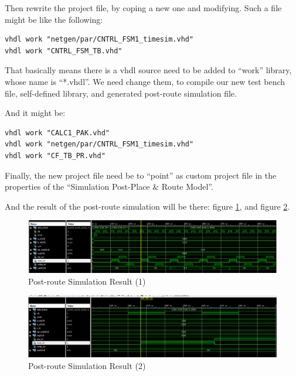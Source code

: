 \documentclass{article}
\begin{document}
    Then rewrite the project file, by coping a new one and modifying. Such a file might be like the following:
    
    \begin{lstlisting}
vhdl work "netgen/par/CNTRL_FSM1_timesim.vhd"
vhdl work "CNTRL_FSM_TB.vhd"
    \end{lstlisting}
    
    That basically means there is a vhdl source need to be added to ``work'' library, whose name is ``*.vhdl''.
    We need change them, to compile our new test bench file, self-defined library, and generated post-route simulation file.
    
    And it might be:
    
\begin{lstlisting}
vhdl work "CALC1_PAK.vhd"
vhdl work "netgen/par/CNTRL_FSM1_timesim.vhd"
vhdl work "CF_TB_PR.vhd"
\end{lstlisting}

    Finally, the new project file need be to ``point'' as custom project file in the properties of the 
    ``Simulation Post-Place \& Route Model''.
    
    And the result of the post-route simulation will be there: figure \ref{fig:homework7-3}, and figure \ref{fig:homework7-4}.
    
\begin{figure}
\centering
\includegraphics[width=1\linewidth]{homework7-3}
\caption{Post-route Simulation Result (1)}
\label{fig:homework7-3}
\end{figure}

\begin{figure}
\centering
\includegraphics[width=1\linewidth]{homework7-4}
\caption{Post-route Simulation Result (2)}
\label{fig:homework7-4}
\end{figure}
\end{document}
